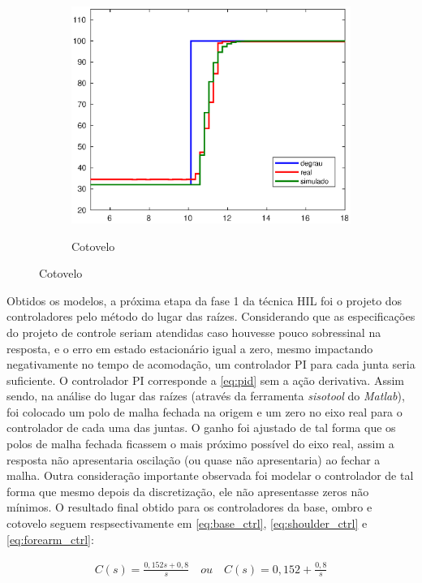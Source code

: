 \begin{figure}[h!]
\begin{subfigure}{.5\textwidth}
    \label{fig:shoulder_ma_simul}
  \end{subfigure}%
  \\[5ex]
  \begin{subfigure}{\textwidth}
    \centering
    \caption{Cotovelo}
    \includegraphics[width = 0.55\columnwidth]{Imagens/forearm_ma_simul}
    \label{fig:forearm_ma_simul}
  \end{subfigure}%
  
  \label{fig:ensaioMalhaAberta} 

\end{figure}

Obtidos os modelos, a próxima etapa da fase 1 da técnica HIL foi o projeto dos 
controladores pelo método do lugar das raízes. Considerando que as especificações do projeto
de controle seriam atendidas caso houvesse pouco sobressinal na resposta, e o erro em estado
estacionário igual a zero, mesmo impactando negativamente no tempo de acomodação, um controlador 
PI para cada junta seria suficiente. O controlador PI corresponde a \autoref{eq:pid} sem a ação 
derivativa. Assim sendo, na análise do lugar das
raízes (através da ferramenta \textit{sisotool} do \textit{Matlab}), foi colocado um polo de malha
fechada na origem e um zero no eixo real para o controlador de cada uma das juntas. O ganho foi 
ajustado de tal forma que os polos de malha fechada ficassem o mais próximo possível do eixo real, 
assim a resposta não apresentaria oscilação (ou quase não apresentaria) ao fechar a malha. Outra 
consideração importante observada foi modelar o controlador de tal forma que mesmo depois da 
discretização, ele não apresentasse zeros não mínimos. O resultado final obtido para os controladores 
da base, ombro e cotovelo seguem respsectivamente em \eqref{eq:base_ctrl}, \ref{eq:shoulder_ctrl}
e \ref{eq:forearm_ctrl}:

\begin{equation}
  \begin{gathered}
    C(s) = \frac{0,152s + 0,8}{s} \quad ou \quad C(s) = 0,152 + \frac{0,8}{s}
  \end{gathered}
  \label{eq:base_ctrl}
\end{equation}

